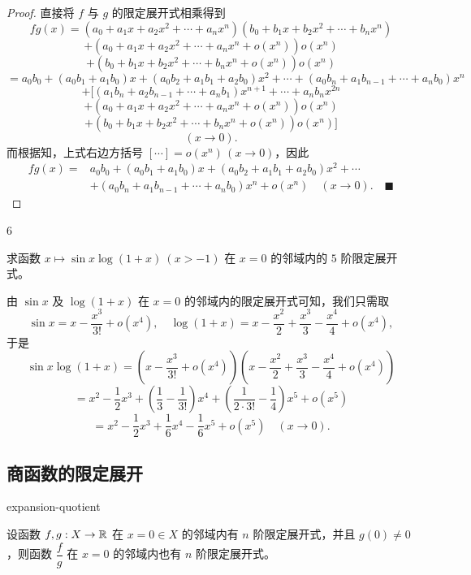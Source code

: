 \begin{proof}

直接将 $f$ 与 $g$ 的限定展开式相乘得到
\[fg(x)=(a_0+a_1x+a_2x^2+\cdots+a_nx^n)(b_0+b_1x+b_2x^2+\cdots+b_nx^n)\]
\[+(a_0+a_1x+a_2x^2+\cdots+a_nx^n+o(x^n))o(x^n)\]
\[+(b_0+b_1x+b_2x^2+\cdots+b_nx^n+o(x^n))o(x^n)\]
\[=a_0b_0+(a_0b_1+a_1b_0)x+(a_0b_2+a_1b_1+a_2b_0)x^2+\cdots+(a_0b_n+a_1b_{n-1}+\cdots+a_nb_0)x^n\]
\[+\bigl[(a_1b_n+a_2b_{n-1}+\cdots+a_nb_1)x^{n+1}+\cdots+a_nb_nx^{2n}\]
\[+(a_0+a_1x+a_2x^2+\cdots+a_nx^n+o(x^n))o(x^n)\]
\[+(b_0+b_1x+b_2x^2+\cdots+b_nx^n+o(x^n))o(x^n)\bigr]\]
\[(x\to0).\]
而根据知，上式右边方括号 $[\cdots]=o(x^n)\,(x\to0)$，因此
\[\begin{aligned}
fg(x)={}&a_0b_0+(a_0b_1+a_1b_0)x+(a_0b_2+a_1b_1+a_2b_0)x^2+\cdots\\
&+(a_0b_n+a_1b_{n-1}+\cdots+a_nb_0)x^n+o(x^n)\quad(x\to0).\quad\blacksquare
\end{aligned}\]

\end{proof}

\begin{sourceexample}{6}

求函数 $x\longmapsto\sin x\log(1+x)\ (x>-1)$ 在 $x=0$ 的邻域内的 $5$ 阶限定展开式。

由 $\sin x$ 及 $\log(1+x)$ 在 $x=0$ 的邻域内的限定展开式可知，我们只需取
\[\sin x=x-\frac{x^3}{3!}+o(x^4),\quad \log(1+x)=x-\frac{x^2}{2}+\frac{x^3}{3}-\frac{x^4}{4}+o(x^4),\]
于是
\[\sin x\log(1+x)=\left(x-\frac{x^3}{3!}+o(x^4)\right)\left(x-\frac{x^2}{2}+\frac{x^3}{3}-\frac{x^4}{4}+o(x^4)\right)\]
\[=x^{2}-\frac{1}{2}x^{3}+\left(\frac{1}{3}-\frac{1}{3!}\right)x^{4}+\left(\frac{1}{2\cdot3!}-\frac{1}{4}\right)x^{5}+o(x^{5})\]
\[=x^{2}-\frac{1}{2}x^{3}+\frac{1}{6}x^{4}-\frac{1}{6}x^{5}+o(x^{5})\quad(x\to0).\]

\end{sourceexample}

\subsection{商函数的限定展开}

\begin{mythm}{}{expansion-quotient}

设函数 $f,g:X\to\mathbb{R}$ 在 $x=0\in X$ 的邻域内有 $n$ 阶限定展开式，并且 $g(0)\neq0$，则函数 $\dfrac{f}{g}$ 在 $x=0$ 的邻域内也有 $n$ 阶限定展开式。

\end{mythm}


